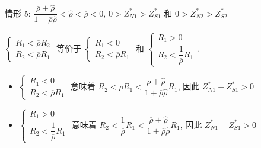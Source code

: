 \documentclass[10.0pt]{article}
\begin{document}
情形 5: $ \dfrac{\overline{\rho} + {\hat \rho}}{1 + \overline{\rho} {\hat \rho}} < {\hat \rho} < \overline{\rho} < 0 $, $ 0 > Z_{N 1}^* > Z_{S 1}^* $ 和 $ 0 > Z_{N 2}^* > Z_{S 2}^* $

$ \left\{ \begin{matrix} R_1 < \overline{\rho} R_2 \\ R_2 < \overline{\rho} R_1 \end{matrix} \right. $ 等价于 $ \left\{ \begin{matrix} R_1 < 0 \\ R_2 < \overline{\rho} R_1 \end{matrix} \right. $ 和 $ \left\{ \begin{matrix} R_1 > 0 \\ R_2 < \dfrac{1}{\overline{\rho}} R_1 \end{matrix} \right. $.
\begin{itemize}
\item $ \left\{ \begin{matrix} R_1 < 0 \\ R_2 < \overline{\rho} R_1 \end{matrix} \right. $ 意味着 $ R_2 < \overline{\rho} R_1 < \dfrac{\overline{\rho} + {\hat \rho}}{1 + \overline{\rho} {\hat \rho}} R_1 $, 因此 $ Z_{N 1}^* - Z_{S 1}^* > 0 $
\item $ \left\{ \begin{matrix} R_1 > 0 \\ R_2 < \dfrac{1}{\overline{\rho}} R_1 \end{matrix} \right. $ 意味着 $ R_2 < \dfrac{1}{\overline{\rho}} R_1 < \dfrac{\overline{\rho} + {\hat \rho}}{1 + \overline{\rho} {\hat \rho}} R_1 $, 因此 $ Z_{N 1}^* - Z_{S 1}^* > 0 $
\end{itemize}
\end{document}
